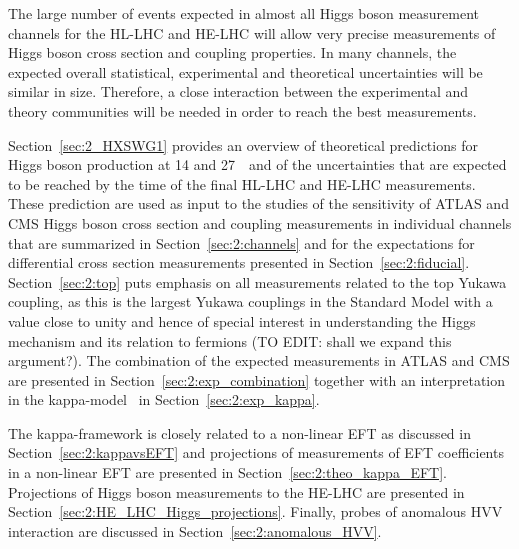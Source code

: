 The large number of events expected in almost all Higgs boson measurement channels for the HL-LHC and HE-LHC will allow very precise measurements of Higgs boson cross section and coupling properties. In many channels, the expected overall statistical, experimental and theoretical uncertainties will be similar in size. Therefore, a close interaction between the experimental and theory communities will be needed in order to reach the best measurements.

Section~\ref{sec:2_HXSWG1} provides an overview of theoretical predictions for Higgs boson production at 14 and 27~\UTeV\ and of the uncertainties that are expected to be reached by the time of the final HL-LHC and HE-LHC measurements. 
These prediction are used as input to the studies of the sensitivity of ATLAS and CMS Higgs boson cross section and coupling measurements in individual channels that are summarized in Section~\ref{sec:2:channels} and for the expectations for differential cross section measurements presented in Section~\ref{sec:2:fiducial}.
Section~\ref{sec:2:top} puts emphasis on all measurements related to the top Yukawa coupling, as this is the largest Yukawa couplings in the Standard Model with a value close to unity and hence of special interest in understanding the Higgs mechanism and its relation to fermions (TO EDIT: shall we expand this argument?).
The combination of the expected measurements in ATLAS and CMS are presented in Section~\ref{sec:2:exp_combination} together with an interpretation in the kappa-model~\cite{LHCHiggsCrossSectionWorkingGroup:2012nn,Heinemeyer:2013tqa} in Section~\ref{sec:2:exp_kappa}.

The kappa-framework is closely related to a non-linear EFT as discussed in Section~\ref{sec:2:kappavsEFT} and projections of measurements of EFT coefficients in a non-linear EFT are presented in Section~\ref{sec:2:theo_kappa_EFT}. Projections of Higgs boson measurements to the HE-LHC are presented in Section~\ref{sec:2:HE_LHC_Higgs_projections}. Finally, probes of anomalous HVV interaction are discussed in Section~\ref{sec:2:anomalous_HVV}.
